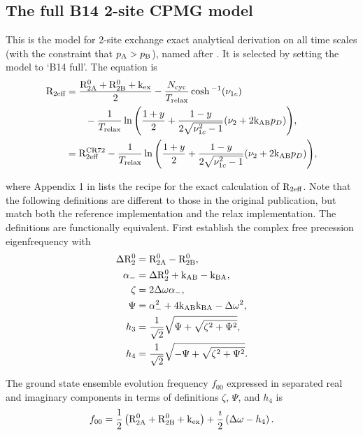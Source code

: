 
\subsection{The full B14 2-site CPMG model}
\label{sect: dispersion: B14 full model}

This is the model for 2-site exchange exact analytical derivation on all time scales (with the constraint that $p_{\textrm{A}} > p_{\textrm{B}}$), named after \citet{Baldwin2014}.
It is selected by setting the model to `B14 full'.
The equation is
\begin{subequations}
\begin{align}
  \mathrm{R}_{\textrm{2eff}} & = \frac{\mathrm{R}_{\mathrm{2A}}^0 + \mathrm{R}_{\mathrm{2B}}^0 + \textrm{k}_{\textrm{ex}}}{2}-\frac{N_{\textrm{cyc}}}{T_{\textrm{relax}}} \cosh{}^{-1}(\nu_{1c}) \nonumber \\
           & \qquad - \frac{1}{T_{\textrm{relax}}}\ln{\left(\frac{1+y}{2} + \frac{1-y}{2\sqrt{\nu_{1c}^2-1}}(\nu_2 + 2\textrm{k}_{\textrm{AB}}p_D)\right)} , \\
    & = \mathrm{R}_{\textrm{2eff}}^{\textrm{CR72}} - \frac{1}{T_{\textrm{relax}}}\ln{\left(\frac{1+y}{2} + \frac{1-y}{2\sqrt{\nu_{1c}^2-1}}(\nu_2 + 2\textrm{k}_{\textrm{AB}}p_D)\right)} ,
\end{align}
\end{subequations}

where Appendix 1 in \citet{Baldwin2014} lists the recipe for the exact calculation of $\mathrm{R}_{\textrm{2eff}}$.
Note that the following definitions are different to those in the original publication, but match both the reference implementation and the relax implementation.
The definitions are functionally equivalent.
First establish the complex free precession eigenfrequency with
\begin{subequations}
\begin{align}
	\Delta \mathrm{R}_2^0 & = \mathrm{R}_{\mathrm{2A}}^0 - \mathrm{R}_{\mathrm{2B}}^0 , \\
	\alpha_- & = \Delta \mathrm{R}_2^0 + \textrm{k}_{\textrm{AB}} - \textrm{k}_{\textrm{BA}} , \\
	\zeta & = 2 \Delta\omega \alpha_- , \\
	\Psi & = \alpha_-^2 + 4 \textrm{k}_{\textrm{AB}} \textrm{k}_{\textrm{BA}} - \Delta\omega^2 , \\
	h_3 &= \frac{1}{\sqrt{2}}\sqrt{\Psi + \sqrt{\zeta^2 + \Psi^2} } , \\
    h_4 &= \frac{1}{\sqrt{2}}\sqrt{-\Psi + \sqrt{\zeta^2 + \Psi^2} } .
\end{align}
\end{subequations}

The ground state ensemble evolution frequency $f_{00}$ expressed in separated real and imaginary components in terms of definitions $\zeta$, $\Psi$, and $h_4$ is
\begin{equation}
	f_{00} = \frac{1}{2}\left(\mathrm{R}_{\mathrm{2A}}^0 + \mathrm{R}_{\mathrm{2B}}^0 + \textrm{k}_{\textrm{ex}}\right) + \frac{\imath}{2}\left(\Delta\omega - h_4\right) .
\end{equation}

